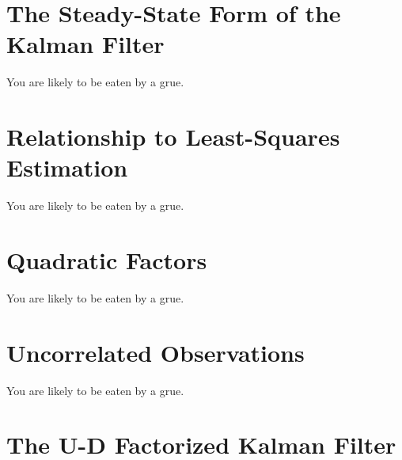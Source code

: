 \documentclass[12pt]{article}
\begin{document}
\clearpage



\section{The Steady-State Form of the Kalman Filter}

You are likely to be eaten by a grue.

\clearpage



\section{Relationship to Least-Squares Estimation}

You are likely to be eaten by a grue.

\clearpage



\section{Quadratic Factors}

You are likely to be eaten by a grue.

\clearpage



\section{Uncorrelated Observations}

You are likely to be eaten by a grue.

\clearpage



\section{The U-D Factorized Kalman Filter}
\end{document}
